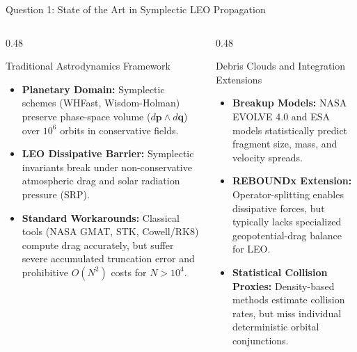 \documentclass[aspectratio=169,10pt]{beamer}
\begin{document}
\begin{frame}{Question 1: State of the Art in Symplectic LEO Propagation}
    \begin{columns}[t]
        \begin{column}{0.48\textwidth}
            \begin{block}{Traditional Astrodynamics Framework}
                \small
                \begin{itemize}
                    \setlength{\itemsep}{3pt}
                    \item \textbf{Planetary Domain:} Symplectic schemes (WHFast, Wisdom-Holman) preserve phase-space volume ($d\mathbf{p} \wedge d\mathbf{q}$) over $10^6$ orbits in conservative fields.
                    \item \textbf{LEO Dissipative Barrier:} Symplectic invariants break under non-conservative atmospheric drag and solar radiation pressure (SRP).
                    \item \textbf{Standard Workarounds:} Classical tools (NASA GMAT, STK, Cowell/RK8) compute drag accurately, but suffer severe accumulated truncation error and prohibitive $O(N^2)$ costs for $N > 10^4$.
                \end{itemize}
            \end{block}
        \end{column}

        \begin{column}{0.48\textwidth}
            \begin{exampleblock}{Debris Clouds and Integration Extensions}
                \small
                \begin{itemize}
                    \setlength{\itemsep}{3pt}
                    \item \textbf{Breakup Models:} NASA EVOLVE 4.0 and ESA models statistically predict fragment size, mass, and velocity spreads.
                    \item \textbf{REBOUNDx Extension:} Operator-splitting enables dissipative forces, but typically lacks specialized geopotential-drag balance for LEO.
                    \item \textbf{Statistical Collision Proxies:} Density-based methods estimate collision rates, but miss individual deterministic orbital conjunctions.
                \end{itemize}
            \end{exampleblock}
        \end{column}
    \end{columns}
\end{frame}
\end{document}
